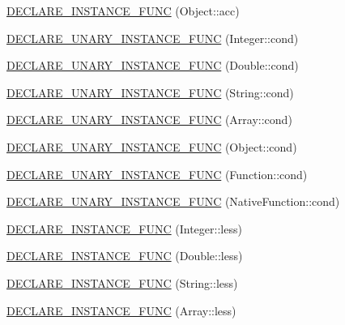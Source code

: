 \begin{DoxyCompactItemize}
\item 
\mbox{\hyperlink{namespace_erable_1_1_types_ae798482754e181d897e0af7eb3682221}{D\+E\+C\+L\+A\+R\+E\+\_\+\+I\+N\+S\+T\+A\+N\+C\+E\+\_\+\+F\+U\+NC}} (Object\+::acc)
\item 
\mbox{\hyperlink{namespace_erable_1_1_types_a1c91bd4966cd32e9bef64de3021de16a}{D\+E\+C\+L\+A\+R\+E\+\_\+\+U\+N\+A\+R\+Y\+\_\+\+I\+N\+S\+T\+A\+N\+C\+E\+\_\+\+F\+U\+NC}} (Integer\+::cond)
\item 
\mbox{\hyperlink{namespace_erable_1_1_types_aa96dff17d4f7d8fcf15fa1c814743232}{D\+E\+C\+L\+A\+R\+E\+\_\+\+U\+N\+A\+R\+Y\+\_\+\+I\+N\+S\+T\+A\+N\+C\+E\+\_\+\+F\+U\+NC}} (Double\+::cond)
\item 
\mbox{\hyperlink{namespace_erable_1_1_types_a33bf05b383268af270da6d1d2bc35e26}{D\+E\+C\+L\+A\+R\+E\+\_\+\+U\+N\+A\+R\+Y\+\_\+\+I\+N\+S\+T\+A\+N\+C\+E\+\_\+\+F\+U\+NC}} (String\+::cond)
\item 
\mbox{\hyperlink{namespace_erable_1_1_types_a209cb50c41e38b49046a93ffdc3009d1}{D\+E\+C\+L\+A\+R\+E\+\_\+\+U\+N\+A\+R\+Y\+\_\+\+I\+N\+S\+T\+A\+N\+C\+E\+\_\+\+F\+U\+NC}} (Array\+::cond)
\item 
\mbox{\hyperlink{namespace_erable_1_1_types_ac63e7473f1c7546673c7cbe71a5a51f7}{D\+E\+C\+L\+A\+R\+E\+\_\+\+U\+N\+A\+R\+Y\+\_\+\+I\+N\+S\+T\+A\+N\+C\+E\+\_\+\+F\+U\+NC}} (Object\+::cond)
\item 
\mbox{\hyperlink{namespace_erable_1_1_types_a0f26fc4cd3ee77b523bb9d33fbced9ed}{D\+E\+C\+L\+A\+R\+E\+\_\+\+U\+N\+A\+R\+Y\+\_\+\+I\+N\+S\+T\+A\+N\+C\+E\+\_\+\+F\+U\+NC}} (Function\+::cond)
\item 
\mbox{\hyperlink{namespace_erable_1_1_types_a88d257dd087e1a48800144056d3cdc8f}{D\+E\+C\+L\+A\+R\+E\+\_\+\+U\+N\+A\+R\+Y\+\_\+\+I\+N\+S\+T\+A\+N\+C\+E\+\_\+\+F\+U\+NC}} (Native\+Function\+::cond)
\item 
\mbox{\hyperlink{namespace_erable_1_1_types_af0d46a21171cc3f1152b9905ad4fcd4c}{D\+E\+C\+L\+A\+R\+E\+\_\+\+I\+N\+S\+T\+A\+N\+C\+E\+\_\+\+F\+U\+NC}} (Integer\+::less)
\item 
\mbox{\hyperlink{namespace_erable_1_1_types_ab2c07559f0bd3e8c9ece09d31e01cd93}{D\+E\+C\+L\+A\+R\+E\+\_\+\+I\+N\+S\+T\+A\+N\+C\+E\+\_\+\+F\+U\+NC}} (Double\+::less)
\item 
\mbox{\hyperlink{namespace_erable_1_1_types_a250159d418f0d93c9da0f8aa379b3e30}{D\+E\+C\+L\+A\+R\+E\+\_\+\+I\+N\+S\+T\+A\+N\+C\+E\+\_\+\+F\+U\+NC}} (String\+::less)
\item 
\mbox{\hyperlink{namespace_erable_1_1_types_a0cff1d8e63d8215bd02d78522e706434}{D\+E\+C\+L\+A\+R\+E\+\_\+\+I\+N\+S\+T\+A\+N\+C\+E\+\_\+\+F\+U\+NC}} (Array\+::less)
\end{DoxyCompactItemize}



